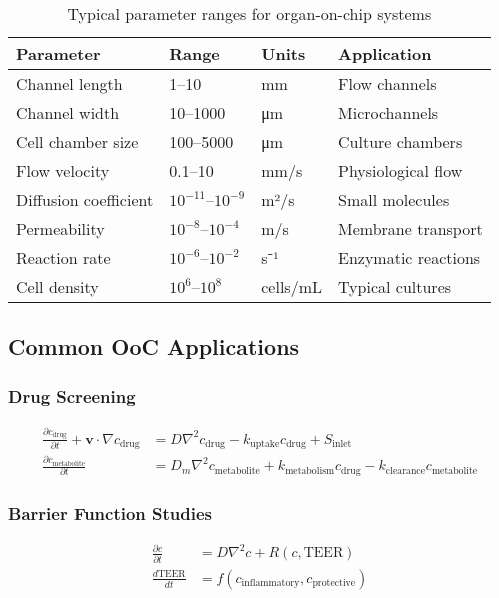 \documentclass[11pt,a4paper]{article}
\begin{document}
\begin{table}[H]
\centering
\begin{tabular}{@{}llll@{}}
\toprule
Parameter & Range & Units & Application \\
\midrule
Channel length & 1--10 & mm & Flow channels \\
Channel width & 10--1000 & μm & Microchannels \\
Cell chamber size & 100--5000 & μm & Culture chambers \\
Flow velocity & 0.1--10 & mm/s & Physiological flow \\
Diffusion coefficient & $10^{-11}$--$10^{-9}$ & m²/s & Small molecules \\
Permeability & $10^{-8}$--$10^{-4}$ & m/s & Membrane transport \\
Reaction rate & $10^{-6}$--$10^{-2}$ & s⁻¹ & Enzymatic reactions \\
Cell density & $10^6$--$10^8$ & cells/mL & Typical cultures \\
\bottomrule
\end{tabular}
\caption{Typical parameter ranges for organ-on-chip systems}
\end{table}

\subsection{Common OoC Applications}

\subsubsection{Drug Screening}
\begin{align}
\frac{\partial c_{\text{drug}}}{\partial t} + \bm{v} \cdot \nabla c_{\text{drug}} &= D\nabla^2 c_{\text{drug}} - k_{\text{uptake}} c_{\text{drug}} + S_{\text{inlet}}\\
\frac{\partial c_{\text{metabolite}}}{\partial t} &= D_m\nabla^2 c_{\text{metabolite}} + k_{\text{metabolism}} c_{\text{drug}} - k_{\text{clearance}} c_{\text{metabolite}}
\end{align}

\subsubsection{Barrier Function Studies}
\begin{align}
\frac{\partial c}{\partial t} &= D\nabla^2 c + R(c,\text{TEER})\\
\frac{d\text{TEER}}{dt} &= f(c_{\text{inflammatory}}, c_{\text{protective}})
\end{align}
\end{document}
